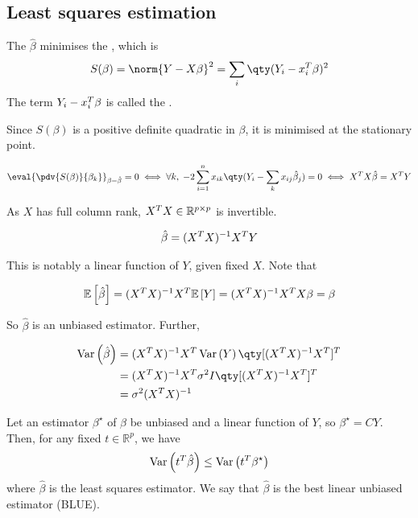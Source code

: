 \subsection{Least squares estimation}
\begin{definition}
	The  $\hat \beta$ minimises the , which is
	\begin{align*}
		S(\beta) = \norm{Y-X\beta}^2 = \sum_i \qty(Y_i - x_i^\tran \beta)^2
	\end{align*}
	The term $Y_i - x_i^T \beta$ is called the .
\end{definition}

Since $S(\beta)$ is a positive definite quadratic in $\beta$, it is minimised at the stationary point.

\begin{align*}
	\eval{\pdv{S(\beta)}{\beta_k}}_{\beta = \hat \beta} = 0 \iff \forall k,\;-2\sum_{i=1}^n x_{ik} \qty(Y_i - \sum_k x_{ij} \hat \beta_j) = 0 \iff X^\tran X \hat \beta = X^\tran Y
\end{align*}

As $X$ has full column rank, $X^T X \in \mathbb{R}^{p \times p}$ is invertible.

\begin{align*}
	\hat \beta = (X^T X)^{-1} X^T Y
\end{align*}

This is notably a linear function of $Y$, given fixed $X$.
Note that

\begin{align*}
	\mathbb{E}\left[{\hat \beta}\right] = (X^T X)^{-1} X^T \mathbb{E}\left[{Y}\right] = (X^T X)^{-1} X^T X\beta = \beta
\end{align*}

So $\hat \beta$ is an unbiased estimator.
Further,

\begin{align*}
	\Var{\hat \beta} &= (X^\tran X)^{-1} X^\tran \Var Y \qty[(X^\tran X)^{-1} X^\tran]^\tran     \\
	                 &= (X^\tran X)^{-1} X^\tran \sigma^2 I \qty[(X^\tran X)^{-1} X^\tran]^\tran \\
	                 &= \sigma^2 (X^\tran X)^{-1}
\end{align*}

\begin{theorem} \label{thm:gauss}
	Let an estimator $\beta^\star$ of $\beta$ be unbiased and a linear function of $Y$, so $\beta^\star = CY$.
	Then, for any fixed $t \in \mathbb R^p$, we have
	\begin{align*}
		\operatorname{Var}\left({t^T \hat \beta}\right) \leq \operatorname{Var}\left({t^T \beta^\star}\right)
	\end{align*}
	where $\hat \beta$ is the least squares estimator.
	We say that $\hat \beta$ is the best linear unbiased estimator (BLUE).
\end{theorem}

